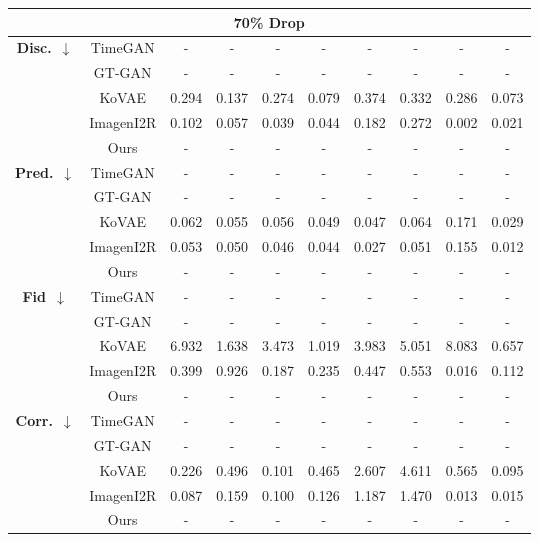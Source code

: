 \documentclass{article}
\theoremstyle{plain}
\theoremstyle{definition}
\theoremstyle{remark}
\begin{document}
\begin{table}[!t]
{\begin{tabular}{cc|cccccccc}
    \multicolumn{10}{c}{\textbf{70\% Drop}} \\
    \midrule
    \multirow{5}{*}{\textbf{Disc.}~$\downarrow$}
      & TimeGAN & - & - & - & - & - & - & - & - \\
      & GT-GAN  & - & - & - & - & - & - & - & - \\
      & KoVAE  & 0.294 & 0.137 & 0.274 & 0.079 & 0.374 & 0.332 & 0.286 & 0.073 \\
      & ImagenI2R   & 0.102
               & 0.057
               & 0.039
               & 0.044
               & 0.182
               & 0.272
               & 0.002
               & 0.021 \\
    & Ours
       & - & - & - & - & - & - & - & - \\
    \midrule
    \multirow{5}{*}{\textbf{Pred.}~$\downarrow$} 
      & TimeGAN & - & - & - & - & - & - & - & - \\
      & GT-GAN  & - & - & - & - & - & - & - & - \\
      & KoVAE  & 0.062 & 0.055 & 0.056 & 0.049 & 0.047 & 0.064 & 0.171 & 0.029 \\
      & ImagenI2R   & 0.053
               & 0.050
               & 0.046
               & 0.044
               & 0.027
               & 0.051
               & 0.155
               & 0.012 \\
    & Ours
       & - & - & - & - & - & - & - & - \\
    \midrule
    \multirow{5}{*}{\textbf{Fid}~$\downarrow$}     
      & TimeGAN & - & - & - & - & - & - & - & - \\
      & GT-GAN  & - & - & - & - & - & - & - & - \\
      & KoVAE  & 6.932 & 1.638 & 3.473 & 1.019 & 3.983 & 5.051 & 8.083 & 0.657 \\
      & ImagenI2R   & 0.399
               & 0.926
               & 0.187
               & 0.235
               & 0.447
               & 0.553
               & 0.016
               & 0.112 \\
    & Ours
       & - & - & - & - & - & - & - & - \\
    \midrule
    \multirow{5}{*}{\textbf{Corr.}~$\downarrow$}     
      & TimeGAN & - & - & - & - & - & - & - & - \\
      & GT-GAN  & - & - & - & - & - & - & - & - \\
      & KoVAE  & 0.226 & 0.496 & 0.101 & 0.465 & 2.607 & 4.611 & 0.565 & 0.095 \\
      & ImagenI2R   & 0.087
               & 0.159
               & 0.100
               & 0.126
               & 1.187
               & 1.470
               & 0.013
               & 0.015 \\
    & Ours
       & - & - & - & - & - & - & - & - \\
    \bottomrule
\end{tabular}
}
\end{table}
\end{document}
